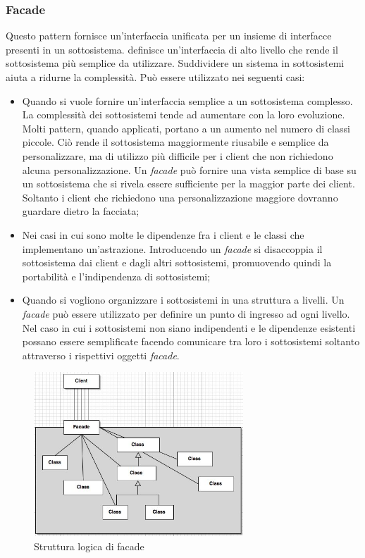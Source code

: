 \subsubsection{Facade}

Questo pattern fornisce un'interfaccia unificata per un insieme di interfacce presenti in un sottosistema.  definisce un'interfaccia di alto livello che rende il sottosistema più semplice da utilizzare. Suddividere un sistema in sottosistemi aiuta a ridurne la complessità. Può essere utilizzato nei seguenti casi:

\begin{itemize}

	\item Quando si vuole fornire un'interfaccia semplice a un sottosistema complesso. La complessità dei sottosistemi tende ad aumentare con la loro evoluzione. Molti pattern, quando applicati, portano a un aumento nel numero di classi piccole. Ciò rende il sottosistema maggiormente riusabile e semplice da personalizzare, ma di utilizzo più difficile per i client che non richiedono alcuna personalizzazione. Un \textit{facade} può fornire una vista semplice di base su un sottosistema che si rivela essere sufficiente per la maggior parte dei client. Soltanto i client che richiedono una personalizzazione maggiore dovranno guardare dietro la facciata;
	\item Nei casi in cui sono molte le dipendenze fra i client e le classi che implementano un'astrazione. Introducendo un \textit{facade} si disaccoppia il sottosistema dai client e dagli altri sottosistemi, promuovendo quindi la portabilità e l'indipendenza di sottosistemi;
	\item Quando si vogliono organizzare i sottosistemi in una struttura a livelli. Un \textit{facade} può essere utilizzato per definire un punto di ingresso ad ogni livello. Nel caso in cui i sottosistemi non siano indipendenti e le dipendenze esistenti possano essere semplificate facendo comunicare tra loro i sottosistemi soltanto attraverso i rispettivi oggetti \textit{facade}.

\end{itemize}

\begin{figure}[h]
\centering \includegraphics[width=0.7\textwidth]{patterns/facade.jpg}
\caption{Struttura logica di facade}
\end{figure}

